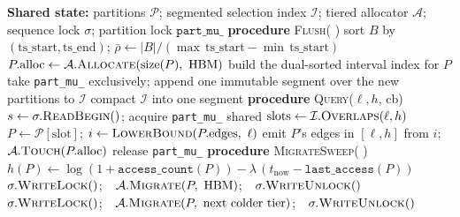 \documentclass[10pt]{article}
\theoremstyle{definition}
\begin{document}
\begin{algorithm}[t]
\caption{Philemon-TSH ingest, query, and background migration}
\label{alg:philemon}
\begin{algorithmic}[1]
\STATE \textbf{Shared state:} partitions $\mathcal{P}$; segmented selection index $\mathcal{I}$; tiered allocator $\mathcal{A}$; sequence lock $\sigma$; partition lock $\texttt{part\_mu\_}$
\STATE
\STATE \textbf{procedure} \textsc{Flush}( ) 
\STATE \quad sort $B$ by $(\mathrm{ts\_start},\mathrm{ts\_end})$; \quad $\bar\rho \gets |B| / (\max\,\mathrm{ts\_start} - \min\,\mathrm{ts\_start})$
  \STATE $P.\mathrm{alloc} \gets \mathcal{A}.\textsc{Allocate}(\mathrm{size}(P),\ \mathrm{HBM})$ 
  \STATE build the dual-sorted interval index for $P$ 
\ENDFOR
\STATE take \texttt{part\_mu\_} exclusively; append one immutable segment over the new partitions to $\mathcal{I}$ 
  \STATE compact $\mathcal{I}$ into one segment 
\ENDIF
\STATE
\STATE \textbf{procedure} \textsc{Query}($\ell,h$, cb)
\REPEAT
  \STATE $s \gets \sigma.\textsc{ReadBegin}()$; \quad acquire \texttt{part\_mu\_} shared
  \STATE $\mathrm{slots} \gets \mathcal{I}.\textsc{Overlaps}(\ell,h)$ 
    \STATE $P \gets \mathcal{P}[\mathrm{slot}]$; \quad $i \gets \textsc{LowerBound}(P.\mathrm{edges},\ \ell)$ 
    \STATE emit $P$'s edges in $[\ell,h]$ from $i$; \quad $\mathcal{A}.\textsc{Touch}(P.\mathrm{alloc})$ 
  \ENDFOR
  \STATE release \texttt{part\_mu\_}
 
\STATE
\STATE \textbf{procedure} \textsc{MigrateSweep}( ) 
  \STATE $h(P) \gets \log(1+\texttt{access\_count}(P)) - \lambda\,(t_{\text{now}} - \texttt{last\_access}(P))$
    \STATE $\sigma.\textsc{WriteLock}()$;\ \ $\mathcal{A}.\textsc{Migrate}(P,\ \mathrm{HBM})$;\ \ $\sigma.\textsc{WriteUnlock}()$
    \STATE $\sigma.\textsc{WriteLock}()$;\ \ $\mathcal{A}.\textsc{Migrate}(P,\ \text{next colder tier})$;\ \ $\sigma.\textsc{WriteUnlock}()$
  \ENDIF
\ENDFOR
\end{algorithmic}
\end{algorithm}
\end{document}
